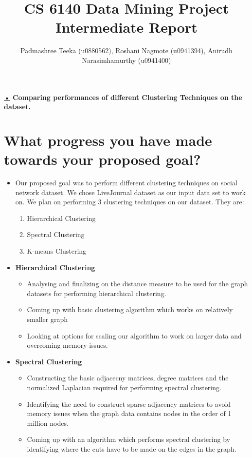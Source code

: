 \documentclass[11pt]{exam}
\title{CS 6140 Data Mining Project Intermediate Report}
\author{Padmashree Teeka (u0880562), Roshani Nagmote (u0941394), Anirudh Narasimhamurthy (u0941400)}
\begin{document}
\maketitle

\textbf{\underline{•} Comparing performances of different Clustering Techniques on the dataset.}

%
%

\section{What progress you have made towards your proposed goal?}

\begin{itemize}
	
 \item[] Our proposed goal was to perform different clustering techniques on social network dataset. We chose LiveJournal dataset as our input data set to work on. We plan on performing 3 clustering techniques on our dataset. They are: 
\begin{enumerate}
	
\item  Hierarchical Clustering
\item  Spectral Clustering
\item  K-means Clustering 

\end{enumerate}

\item \textbf{Hierarchical Clustering}
\begin{itemize}
\item  Analysing and finalizing on the distance measure to be used for the graph datasets for performing hierarchical clustering.
\item Coming up with basic clustering algorithm which works on relatively smaller graph
\item Looking at options for scaling our algorithm to work on larger data and overcoming memory issues.
\end{itemize}

\item \textbf{Spectral Clustering}

\begin{itemize}

\item Constructing the basic adjacecny matrices, degree matrices and the normalized Laplacian required for performing spectral clustering.
\item Identifying the need to construct sparse adjacency matrices to avoid memory issues when the graph data contains nodes in the order of 1 million nodes.
\item Coming up with an algorithm which performs spectral clustering by identifying where the cuts have to be made on the edges in the graph.

\end{itemize}	


\end{itemize}
\end{document}
